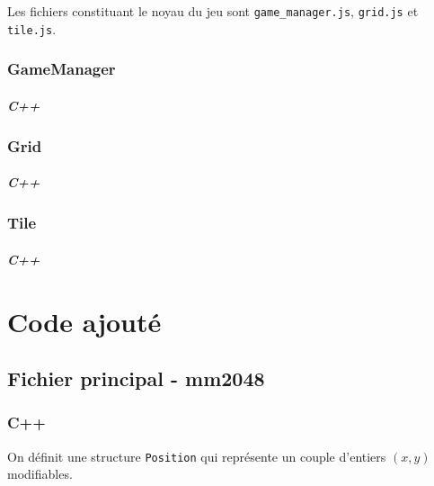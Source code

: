 \documentclass[a4paper]{report}
\begin{document}
Les fichiers constituant le noyau du jeu sont \verb|game_manager.js|, \verb|grid.js| et \verb|tile.js|.

\subsection{GameManager}
\paragraph{C++}




\subsection{Grid}
\paragraph{C++}




\subsection{Tile}
\paragraph{C++}





\chapter{Code ajouté}
\section{Fichier principal - mm2048}
\subsection{C++}
On définit une structure \verb|Position| qui représente un couple d'entiers $(x,y)$ modifiables.



\end{document}
